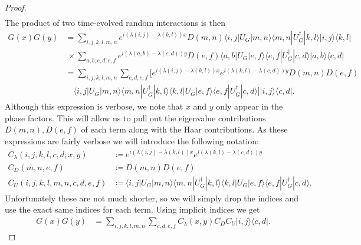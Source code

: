 \documentclass{article}
\newcommand{\ket}[1]{|#1\rangle}
\newcommand{\bra}[1]{\langle #1|}
\newcommand{\ketbra}[2]{| #1\rangle\! \langle #2|}
\begin{document}
\begin{proof}
\begin{align}
\end{align}
The product of two time-evolved random interactions is then 
\begin{align}
    G(x) G(y) &= \sum_{i,j,k,l,m,n} e^{i (\lambda(i,j) - \lambda(k,l))x} D(m,n) \bra{i,j} U_G \ket{m,n} \bra{m,n} U_G^\dagger \ket{k,l} \ketbra{i,j}{k,l} \nonumber \\
    &~ \times \sum_{a,b,c,d,e,f} e^{i(\lambda(a,b) - \lambda(c,d))y} D(e,f) \bra{a,b} U_G \ket{e,f} \bra{e,f} U_G^\dagger \ket{c,d} \ketbra{a,b}{c,d} \\ 
    &= \sum_{i,j,k,l,m,n} \sum_{c,d,e,f} \bigg[ e^{i(\lambda(i,j) - \lambda(k,l))x} e^{i(\lambda(k,l) - \lambda(c,d))y} D(m,n) D(e,f) \nonumber \\
    & \quad \bra{i,j} U_G \ket{m,n} \bra{m,n} U_G^\dagger \ket{k,l} \bra{k,l} U_G \ket{e,f} \bra{e,f} U_G^\dagger \ket{c,d} \bigg] \ketbra{i,j}{c,d}.
\end{align}
Although this expression is verbose, we note that $x$ and $y$ only appear in the phase factors. This will allow us to pull out the eigenvalue contributions $D(m,n), D(e,f)$ of each term along with the Haar contributions. As these expressions are fairly verbose we will introduce the following notation:
\begin{align}
    C_\lambda(i,j,k,l,c,d; x, y) &\coloneqq e^{i(\lambda(i,j) - \lambda(k,l))x} e^{i(\lambda(k,l) - \lambda(c,d))y} \\
    C_D(m,n,e,f) &\coloneqq D(m,n) D(e,f) \\
    C_U(i,j,k,l,m,n,c,d,e,f) &\coloneqq \bra{i,j} U_G \ket{m,n} \bra{m,n} U_G^\dagger \ket{k,l} \bra{k,l} U_G \ket{e,f} \bra{e,f} U_G^\dagger \ket{c,d}.
\end{align}
Unfortunately these are not much shorter, so we will simply drop the indices and use the exact same indices for each term. Using implicit indices we get
\begin{align}
    G(x) G(y) &= \sum_{i,j,k,l,m,n} \sum_{c,d,e,f} C_\lambda(x,y) C_D C_U \ketbra{i,j}{c,d}.
\end{align}


\end{proof}
\end{document}

